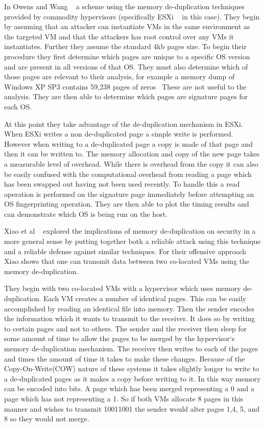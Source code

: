 In Owens and Wang ~\cite{owens_non-interactive_2011} a scheme using the memory de-duplication techniques provided by commodity hypervisors (specifically ESXi ~\cite{chaubal_architecture_2008} in this case). They begin by assuming that an attacker can instantiate VMs in the same environment as the targeted VM and that the attackers has root control over any VMs it instantiates. Further they assume the standard 4kb pages size. To begin their procedure they first determine which pages are unique to a specific OS version and are present in all versions of that OS. They must also determine which of those pages are relevant to their analysis, for example a memory dump of Windows XP SP3 contains 59,238 pages of zeros~\cite{owens_non-interactive_2011} These are not useful to the analysis. They are then able to determine which pages are signature pages for each OS. 

At this point they take advantage of the de-duplication mechanism in ESXi. When ESXi writes a non de-duplicated page a simple write is performed. However when writing to a de-duplicated page a copy is made of that page and then it can be written to. The memory allocation and copy of the new page takes a measurable level of overhead. While there is overhead from the copy it can also be easily confused with the computational overhead from reading a page which has been swapped out having not been used recently. To handle this a read operation is performed on the signature page immediately before attempting an OS fingerprinting operation. They are then able to plot the timing results and can demonstrate which OS is being run on the host. 

Xiao et al ~\cite{xiao_security_2013} explored the implications of memory de-duplication on security in a more general sense by putting together both a reliable attack using this technique and a reliable defense against similar techniques. For their offensive approach Xiao shows that one can transmit data between two co-located VMs using the memory de-duplication. 

They begin with two co-located VMs with a hypervisor which uses memory de-duplication. Each VM creates a number of identical pages. This can be easily accomplished by reading an identical file into memory. Then the sender encodes the information which it wants to transmit to the receiver. It does so by writing to certain pages and not to others. The sender and the receiver then sleep for some amount of time to allow the pages to be merged by the hypervisor`s memory de-duplication mechanism. The receiver then writes to each of the pages and times the amount of time it takes to make these changes. Because of the Copy-On-Write(COW) nature of these systems it takes slightly longer to write to a de-duplicated pages as it makes a copy before writing to it. In this way memory can be encoded into bits. A page which has been merged representing a 0 and a page which has not representing a 1. So if both VMs allocate 8 pages in this manner and wishes to transmit 10011001 the sender would alter pages 1,4, 5, and 8 so they would not merge. 

